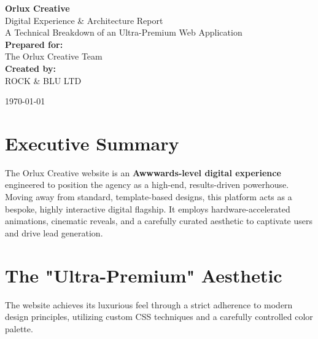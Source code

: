 \documentclass[11pt, a4paper]{article}
\begin{document}
\begin{titlepage}
    \centering
    \vspace*{4cm}
    
    {\Huge \bfseries \textcolor{orluxgold}{Orlux Creative} }\\[1cm]
    {\LARGE Digital Experience \& Architecture Report}\\[0.5cm]
    {\large A Technical Breakdown of an Ultra-Premium Web Application}\\[3cm]
    
    {\large \textbf{Prepared for:}}\\[0.2cm]
    {\large The Orlux Creative Team}\\[2cm]
    
    {\large \textbf{Created by:}}\\[0.2cm]
    {\large ROCK \& BLU LTD}\\[2cm]
    
    \vfill
    
    {\large \today}\\[1cm]
\end{titlepage}


\section{Executive Summary}
The Orlux Creative website is an \textbf{Awwwards-level digital experience} engineered to position the agency as a high-end, results-driven powerhouse. Moving away from standard, template-based designs, this platform acts as a bespoke, highly interactive digital flagship. It employs hardware-accelerated animations, cinematic reveals, and a carefully curated aesthetic to captivate users and drive lead generation.

\section{The "Ultra-Premium" Aesthetic}
The website achieves its luxurious feel through a strict adherence to modern design principles, utilizing custom CSS techniques and a carefully controlled color palette.
\end{document}

